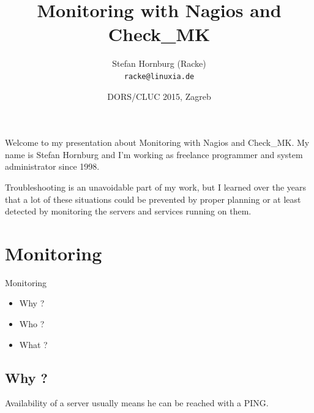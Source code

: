 \usepackage[utf8]{inputenc}
\usepackage[T1]{fontenc}
\usepackage{mathptmx}
\usepackage[scaled=.90]{helvet}
\usepackage{courier}
\usepackage{caption}
\captionsetup{labelformat=empty,labelsep=none}
\usepackage{verbatim}
\usepackage{hyperref}
\usepackage{listings}
\usepackage{ulem}
\lstset{language=Perl,basicstyle=\normalsize,tabsize=3,showstringspaces=false}

\title{Monitoring with Nagios and Check\_MK}
\author[racke]{Stefan Hornburg (Racke)\\ \texttt{racke@linuxia.de}}
\date{DORS/CLUC 2015, Zagreb}


\maketitle{}

\begin{frame}
  \titlepage
\end{frame}

\tableofcontents


Welcome to my presentation about Monitoring with Nagios and Check\_MK.
My name is Stefan Hornburg and I'm working as freelance programmer
and system administrator since 1998.

Troubleshooting is an unavoidable part of my work, but I learned
over the years that a lot of these situations could be prevented
by proper planning or at least detected by monitoring the servers
and services running on them.

\section{Monitoring}

\begin{frame}[fragile]{Monitoring}

\begin{itemize}
\item Why ?
\item Who ?
\item What ?
\end{itemize}
\end{frame}

\subsection{Why ?}

Availability of a server usually means he can be reached with a PING.

